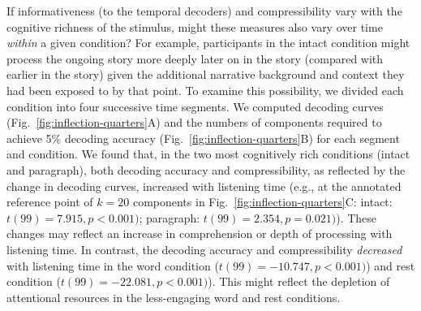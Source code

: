 \documentclass[english, 11pt]{article}
\begin{document}
If informativeness (to the temporal decoders) and compressibility vary with the
cognitive richness of the stimulus, might these measures also vary over time
\textit{within} a given condition? For example, participants in the intact
condition might process the ongoing story more deeply later on in the story
(compared with earlier in the story) given the additional narrative background
and context they had been exposed to by that point. To examine this
possibility, we divided each condition into four successive time segments. We
computed decoding curves (Fig.~\ref{fig:inflection-quarters}A) and the numbers
of components required to achieve 5\% decoding accuracy
(Fig.~\ref{fig:inflection-quarters}B) for each segment and condition. We found
that, in the two most cognitively rich conditions (intact and paragraph), both
decoding accuracy and compressibility, as reflected by the change in decoding
curves, increased with listening time (e.g., at the annotated reference point
of $k = 20$ components in Fig.~\ref{fig:inflection-quarters}C: intact: $t(99) =
7.915, p < 0.001)$; paragraph: $t(99) = 2.354, p = 0.021)$). These changes may
reflect an increase in comprehension or depth of processing with listening
time. In contrast, the decoding accuracy and compressibility \textit{decreased}
with listening time in the word condition ($t(99) = -10.747, p < 0.001)$) and
rest condition ($t(99) = -22.081, p < 0.001)$). This might reflect the
depletion of attentional resources in the less-engaging word and rest
conditions.
\end{document}
